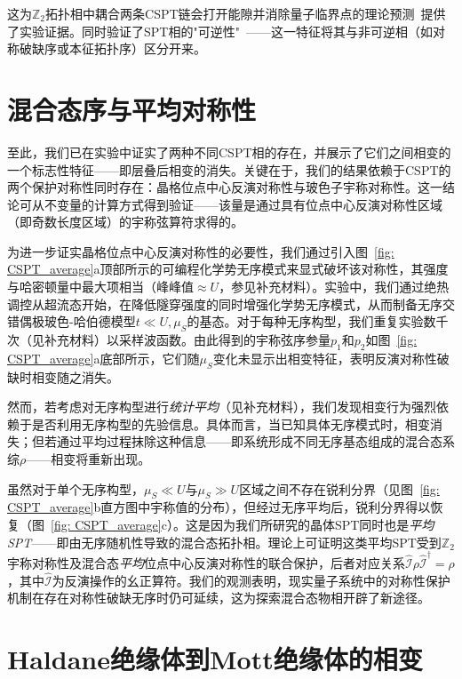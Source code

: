 \documentclass[preprint,superscriptaddress,floatfix, nofootinbib]{revtex4-2}
\begin{document}
\begin{CJK*}{UTF8}{gbsn}
这为$\mathbb{Z}_2$拓扑相中耦合两条CSPT链会打开能隙并消除量子临界点的理论预测~\cite{Gu2009}提供了实验证据。同时验证了SPT相的"可逆性"~\cite{Freed2014}——这一特征将其与非可逆相（如对称破缺序或本征拓扑序）区分开来。
\section{混合态序与平均对称性}

至此，我们已在实验中证实了两种不同CSPT相的存在，并展示了它们之间相变的一个标志性特征——即层叠后相变的消失。关键在于，我们的结果依赖于CSPT的两个保护对称性同时存在：晶格位点中心反演对称性与玻色子宇称对称性。这一结论可从不变量的计算方式得到验证——该量是通过具有位点中心反演对称性区域（即奇数长度区域）的宇称弦算符求得的。

为进一步证实晶格位点中心反演对称性的必要性，我们通过引入图~\ref{fig: CSPT_average}a顶部所示的可编程化学势无序模式来显式破坏该对称性，其强度与哈密顿量中最大项相当（峰峰值$\approx U$，参见补充材料）。实验中，我们通过绝热调控从超流态开始，在降低隧穿强度的同时增强化学势无序模式，从而制备无序交错偶极玻色-哈伯德模型$t \ll U, \mu_S$的基态。对于每种无序构型，我们重复实验数千次（见补充材料）以采样波函数。由此得到的宇称弦序参量$p_1$和$p_2$如图~\ref{fig: CSPT_average}a底部所示，它们随$\mu_S$变化未显示出相变特征，表明反演对称性破缺时相变随之消失。

然而，若考虑对无序构型进行\textit{统计平均}（见补充材料），我们发现相变行为强烈依赖于是否利用无序构型的先验信息。具体而言，当已知具体无序模式时，相变消失；但若通过平均过程抹除这种信息——即系统形成不同无序基态组成的混合态系综$\rho$——相变将重新出现\cite{Ma2023}。

虽然对于单个无序构型，$\mu_S \ll U$与$\mu_S \gg U$区域之间不存在锐利分界（见图~\ref{fig: CSPT_average}b直方图中宇称值的分布），但经过无序平均后，锐利分界得以恢复（图~\ref{fig: CSPT_average}c）。这是因为我们所研究的晶体SPT同时也是\textit{平均SPT}——即由无序随机性导致的混合态拓扑相\cite{Fu2012, Ringel12, Mong12, Fulga14, Ma2023, Ma23_b, De2022, Coser2019, Fan2024, Bao2023, Verstraete2009, Diehl2008, Sang2024, Sang2025}。理论上可证明这类平均SPT受到$\mathbb{Z}_2$宇称对称性及混合态\textit{平均}位点中心反演对称性的联合保护，后者对应关系$\hat{\mathcal{I}} \rho \hat{\mathcal{I}}^{\dagger} = \rho$，其中$\hat{\mathcal{I}}$为反演操作的幺正算符。我们的观测表明，现实量子系统中的对称性保护机制在存在对称性破缺无序时仍可延续，这为探索混合态物相开辟了新途径。
\section{Haldane绝缘体到Mott绝缘体的相变 \label{sec:HI}}


\end{CJK*}
\end{document}
